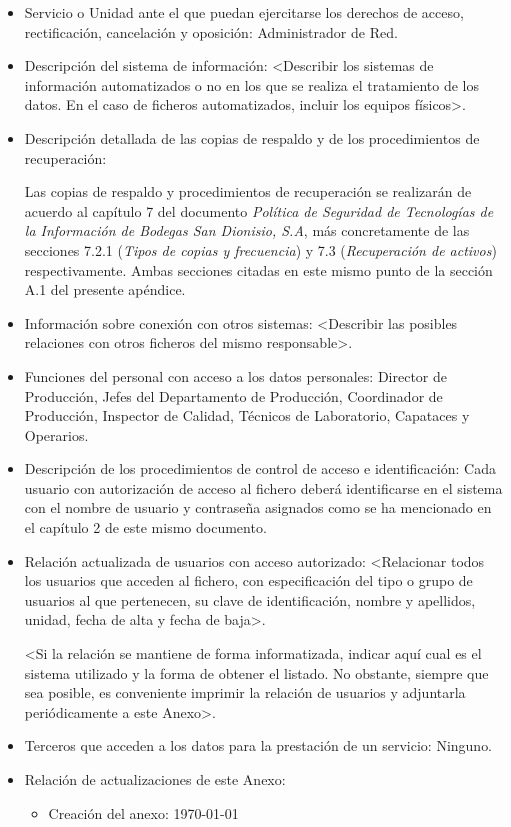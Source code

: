 \documentclass[a4paper,11pt,bibtotoc,noliststotoc]{scrbook}
\begin{document}
\begin{itemize}
\item Servicio o Unidad ante el que puedan ejercitarse los derechos de acceso, rectificación, cancelación y oposición: Administrador de Red.

\item Descripción del sistema de información: <Describir los sistemas de información automatizados o no en los que se realiza el tratamiento de los datos. En el caso de ficheros automatizados, incluir los equipos físicos>.

\item Descripción detallada de las copias de respaldo y de los procedimientos de recuperación:

Las copias de respaldo y procedimientos de recuperación se realizarán de acuerdo al capítulo 7 del documento \emph{Política de Seguridad de Tecnologías de la Información de Bodegas San Dionisio, S.A}, más concretamente de las secciones 7.2.1 (\emph{Tipos de copias y frecuencia}) y 7.3 (\emph{Recuperación de activos}) respectivamente. Ambas secciones citadas en este mismo punto de la sección A.1 del presente apéndice.

\item Información sobre conexión con otros sistemas: <Describir las posibles relaciones con otros ficheros del mismo responsable>.

\item Funciones del personal con acceso a los datos personales: Director de Producción, Jefes del Departamento de Producción, Coordinador de Producción, Inspector de Calidad, Técnicos de Laboratorio, Capataces y Operarios.

\item Descripción de los procedimientos de control de acceso e identificación: Cada usuario con autorización de acceso al fichero deberá identificarse en el sistema con el nombre de usuario y contraseña asignados como se ha mencionado en el capítulo 2 de este mismo documento.

\item Relación actualizada de usuarios con acceso autorizado: <Relacionar todos los usuarios que acceden al fichero, con especificación del tipo o grupo de usuarios al que pertenecen, su clave de identificación, nombre y apellidos, unidad, fecha de alta y fecha de baja>.

<Si la relación se mantiene de forma informatizada, indicar aquí cual es el sistema utilizado y la forma de obtener el listado. No obstante, siempre que sea posible, es conveniente imprimir la relación de usuarios y adjuntarla periódicamente a este Anexo>.

\item Terceros que acceden a los datos para la prestación de un servicio: Ninguno.


\item Relación de actualizaciones de este Anexo: 

	\begin{itemize}
	\item Creación del anexo: \today
	\end{itemize}

\end{itemize}
\end{document}
